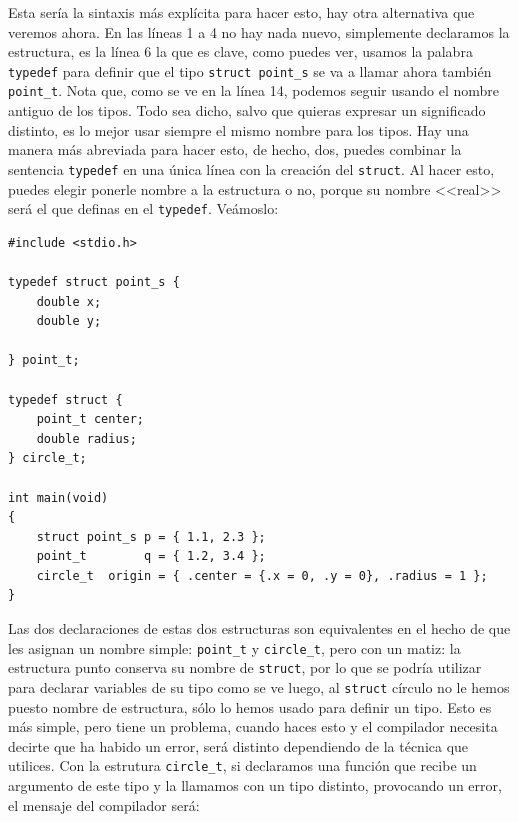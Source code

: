 \documentclass[a4paper]{article}
\begin{document}
Esta sería la sintaxis más explícita para hacer esto, hay otra alternativa que
veremos ahora.
En las líneas 1 a 4 no hay nada nuevo, simplemente declaramos la estructura,
es la línea 6 la que es clave, como puedes ver, usamos la palabra
\verb!typedef! para definir que el tipo \verb!struct point_s! se va a llamar
ahora también \verb!point_t!. Nota que, como se ve en la línea 14, podemos
seguir usando el nombre antiguo de los tipos. Todo sea dicho, salvo que quieras
expresar un significado distinto, es lo mejor usar siempre el mismo nombre para los
tipos. Hay una manera más abreviada para hacer esto, de hecho, dos, puedes
combinar la sentencia \verb!typedef! en una única línea con la creación del
\verb!struct!. Al hacer esto, puedes elegir ponerle nombre a la estructura o no,
porque su nombre <<real>> será el que definas en el \verb!typedef!. Veámoslo:


\noindent
\begin{minipage}[H]{\linewidth}
\mbox{}
\begin{lstlisting}[style=C,
caption={Diferentes combinaciones de \texttt{struct} con \texttt{typedef}},
label={lst:structTypeCombo}]
#include <stdio.h>

typedef struct point_s {
    double x;
    double y;

} point_t;

typedef struct {
    point_t center;
    double radius;
} circle_t;

int main(void)
{
    struct point_s p = { 1.1, 2.3 };
    point_t        q = { 1.2, 3.4 };
    circle_t  origin = { .center = {.x = 0, .y = 0}, .radius = 1 };
}
\end{lstlisting}
\end{minipage}

Las dos declaraciones de estas dos estructuras son equivalentes en el hecho
de que les asignan un nombre simple: \verb!point_t! y \verb!circle_t!, pero con
un matiz: la estructura punto conserva su nombre de \verb!struct!, por lo que
se podría utilizar para declarar variables de su tipo como se ve luego, al
\verb!struct! círculo no le hemos puesto nombre de estructura, sólo lo hemos
usado para definir un tipo. Esto es más simple, pero tiene un problema, cuando
haces esto y el compilador necesita decirte que ha habido un error, será
distinto dependiendo de la técnica que utilices. Con la estrutura
\verb!circle_t!, si declaramos una función que recibe un argumento de este tipo
y la llamamos con un tipo distinto, provocando un error, el mensaje del
compilador será:
\end{document}
